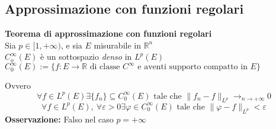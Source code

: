 \documentclass[a4paper]{article}
\newcommand{\R}{\mathbb{R}}
\begin{document}
\subsection{Approssimazione con funzioni regolari}
\begin{tcolorbox}
	\textbf{Teorema di approssimazione con funzioni regolari}\\
	Sia $p\in[1,+\infty)$, e sia $E$ misurabile in $\R^n$
	\\$C_o^\infty(E)$ è un sottospazio \textit{denso} in $L^p(E)$
	\\$C_0^\infty(E):=\{f:E\to \R\text{ di classe }C^\infty \text{ e aventi supporto compatto in }E\}$ 
\end{tcolorbox}
Ovvero 
\[\forall f\in L^p(E) \exists \{f_n\} \subseteq C_0^\infty(E)\text{ tale che }\|f_n-f\|_{L^p}\to_{n\to +\infty}0\]
\[\forall f\in L^p(E),\ \forall \varepsilon>0 \exists \varphi\in C_0^\infty(E)\text{ tale che }\|\varphi-f\|_{L^p}<\varepsilon\]
\textbf{Osservazione:} Falso nel caso $p=+\infty$
\end{document}
